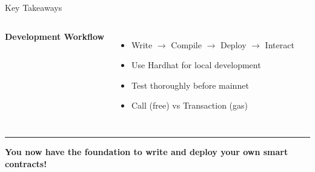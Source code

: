 \documentclass[8pt,aspectratio=169]{beamer}
\newcommand{\bottomnote}[1]{%
\vfill
\vspace{-2mm}
\textcolor{mllavender2}{\rule{\textwidth}{0.4pt}}
\vspace{1mm}
\footnotesize
\textbf{#1}
}
\begin{document}
\begin{frame}[t]{Key Takeaways}
\begin{columns}[T]
\vspace{0.5em}
\textbf{Development Workflow}
\begin{itemize}
\item \checkmark Write $\rightarrow$ Compile $\rightarrow$ Deploy $\rightarrow$ Interact
\item \checkmark Use Hardhat for local development
\item \checkmark Test thoroughly before mainnet
\item \checkmark Call (free) vs Transaction (gas)
\end{itemize}
\end{columns}

\vspace{0.5em}
\begin{center}
\end{center}

\bottomnote{You now have the foundation to write and deploy your own smart contracts!}
\end{frame}
\end{document}
